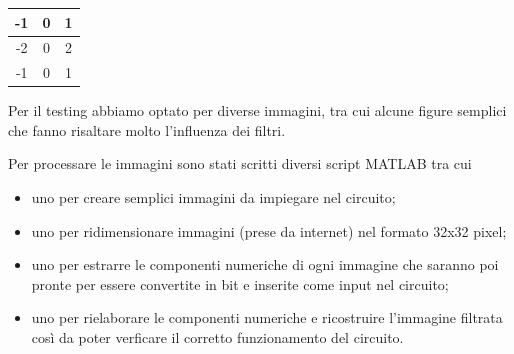 \begin{table}[H]
\begin{tabular}{|c|c|c|}
\hline
-1 & 0 & 1 \\ \hline
-2 & 0 & 2 \\ \hline
-1 & 0 & 1 \\ \hline
\end{tabular}
\end{table}

Per il testing abbiamo optato per diverse immagini, tra cui alcune figure semplici che fanno risaltare molto l'influenza dei filtri.


 Per processare le immagini sono stati scritti diversi script MATLAB tra cui 

\begin{itemize}
	\item uno per creare semplici immagini da impiegare nel circuito;
	\item uno per ridimensionare immagini (prese da internet) nel formato 32x32 pixel;
	\item uno per estrarre le componenti numeriche di ogni immagine che saranno poi pronte per essere convertite in bit e inserite come 			input nel circuito;
	\item uno per rielaborare le componenti numeriche e ricostruire l'immagine filtrata così da poter verficare il corretto funzionamento del circuito.
\end{itemize}